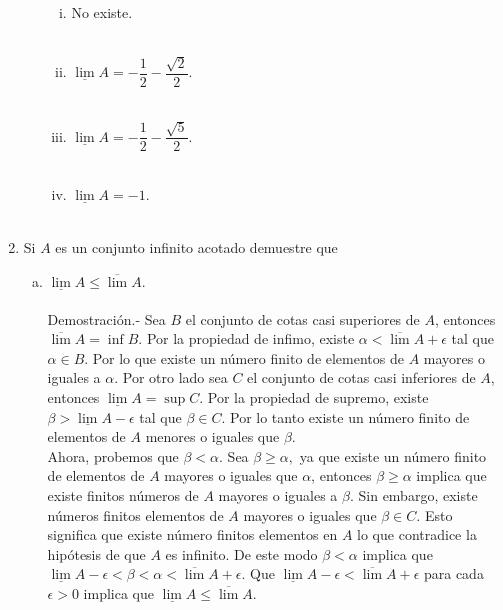 \begin{enumerate}[\bfseries 1.]
\begin{enumerate}[(a)]
\begin{enumerate}[(i)]
		    \item No existe.\\\\

		    \item $\underline{\lim} A = -\dfrac{1}{2}-\dfrac{\sqrt{2}}{2}$.\\\\

		    \item $\underline{\lim} A = -\dfrac{1}{2}-\dfrac{\sqrt{5}}{2}$.\\\\

		    \item $\underline{\lim} A = -1$.\\\\

		\end{enumerate}

	\end{enumerate}

    \item Si $A$ es un conjunto infinito acotado demuestre que

	\begin{enumerate}[(a)]

	    \item $\underline{\lim} A \leq \overline{\lim} A.$\\\\
		Demostración.-\; Sea $B$ el conjunto de cotas casi superiores de $A$, entonces $\overline{\lim} A = \inf B.$ Por la propiedad de infimo, existe $\alpha<\overline{\lim} A + \epsilon$ tal que $\alpha \in B$. Por lo que existe un número finito de elementos de $A$ mayores o iguales a $\alpha.$ Por otro lado sea $C$ el conjunto de cotas casi inferiores de $A$, entonces $\underline{\lim} A = \sup C$. Por la propiedad de supremo, existe $\beta>\underline{\lim} A - \epsilon$ tal que $\beta \in C$. Por lo tanto existe un número finito de elementos de $A$ menores o iguales que $\beta$.\\
		Ahora, probemos que $\beta<\alpha$. Sea $\beta\geq \alpha,$ ya que existe un número finito de elementos de $A$ mayores o iguales que $\alpha$, entonces $\beta\geq \alpha$ implica que existe finitos números de $A$ mayores o iguales a $\beta$. Sin embargo, existe números finitos elementos de $A$ mayores o iguales que $\beta\in C$. Esto significa que existe número finitos elementos en $A$ lo que contradice la hipótesis de que $A$ es infinito. De este modo $\beta<\alpha$ implica que $\underline{\lim} A -\epsilon < \beta < \alpha < \overline{\lim} A + \epsilon.$ Que $\underline{\lim} A - \epsilon < \overline{\lim} A + \epsilon$ para cada $\epsilon>0$ implica que $\underline{\lim} A \leq \overline{\lim} A.$\\\\


\end{enumerate}
\end{enumerate}
